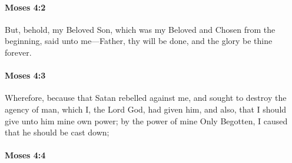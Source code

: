 
		\paragraph{Moses 4:2} %
			\label{MOSES-4-2}

			But, behold, my Beloved Son, which was my Beloved and Chosen from the beginning, said unto me---Father, thy will be done, and the glory be thine forever.


		\paragraph{Moses 4:3} %
			\label{MOSES-4-3}

			Wherefore, because that Satan rebelled against me, and sought to destroy the agency of man, which I, the Lord God, had given him, and also, that I should give unto him mine own power; by the power of mine Only Begotten, I caused that he should be cast down;


		\paragraph{Moses 4:4} %
			\label{MOSES-4-4}


